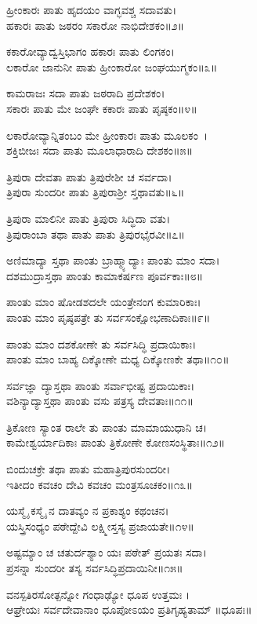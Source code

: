 ಹ್ರೀಂಕಾರಃ ಪಾತು ಹೃದಯಂ ವಾಗ್ಭವಶ್ಚ ಸದಾವತು।\\
ಹಕಾರಃ ಪಾತು ಜಠರಂ ಸಕಾರೋ ನಾಭಿದೇಶಕಂ॥೨॥

ಕಕಾರೋವ್ಯಾದ್ವಸ್ತಿಭಾಗಂ ಹಕಾರಃ ಪಾತು ಲಿಂಗಕಂ।\\
ಲಕಾರೋ ಜಾನುನೀ ಪಾತು ಹ್ರೀಂಕಾರೋ ಜಂಘಯುಗ್ಮಕಂ॥೩॥

ಕಾಮರಾಜಃ ಸದಾ ಪಾತು ಜಠರಾದಿ ಪ್ರದೇಶಕಂ।\\
ಸಕಾರಃ ಪಾತು ಮೇ ಜಂಘೇ ಕಕಾರಃ ಪಾತು ಪೃಷ್ಠಕಂ॥೪॥

ಲಕಾರೋವ್ಯಾನ್ನಿತಂಬಂ ಮೇ ಹ್ರೀಂಕಾರಃ ಪಾತು ಮೂಲಕಂ~।\\
ಶಕ್ತಿಬೀಜಃ ಸದಾ ಪಾತು ಮೂಲಾಧಾರಾದಿ ದೇಶಕಂ॥೫॥

ತ್ರಿಪುರಾ ದೇವತಾ ಪಾತು ತ್ರಿಪುರೇಶೀ ಚ ಸರ್ವದಾ।\\
ತ್ರಿಪುರಾ ಸುಂದರೀ ಪಾತು ತ್ರಿಪುರಾಶ್ರೀ ಸ್ತಥಾವತು॥೬॥

ತ್ರಿಪುರಾ ಮಾಲಿನೀ ಪಾತು ತ್ರಿಪುರಾ ಸಿದ್ಧಿದಾ ವತು।\\
ತ್ರಿಪುರಾಂಬಾ ತಥಾ ಪಾತು ಪಾತು ತ್ರಿಪುರಭೈರವೀ॥೭॥

ಅಣಿಮಾದ್ಯಾ ಸ್ತಥಾ ಪಾಂತು ಬ್ರಾಹ್ಮ್ಯಾದ್ಯಾಃ ಪಾಂತು ಮಾಂ ಸದಾ।\\
ದಶಮುದ್ರಾಸ್ತಥಾ ಪಾಂತು ಕಾಮಾಕರ್ಷಣ ಪೂರ್ವಕಾಃ॥೮॥

ಪಾಂತು ಮಾಂ ಷೋಡಶದಲೇ ಯಂತ್ರೇನಂಗ ಕುಮಾರಿಕಾಃ।\\
ಪಾಂತು ಮಾಂ ಪೃಷ್ಠಪತ್ರೇ ತು ಸರ್ವಸಂಕ್ಷೋಭಣಾದಿಕಾಃ॥೯॥

ಪಾಂತು ಮಾಂ ದಶಕೋಣೇ ತು ಸರ್ವಸಿದ್ಧಿ ಪ್ರದಾಯಿಕಾಃ।\\
ಪಾಂತು ಮಾಂ ಬಾಹ್ಯ ದಿಕ್ಕೋಣೇ ಮಧ್ಯ ದಿಕ್ಕೋಣಕೇ ತಥಾ॥೧೦॥

ಸರ್ವಜ್ಞಾ ದ್ಯಾಸ್ತಥಾ ಪಾಂತು ಸರ್ವಾಭೀಷ್ಟ ಪ್ರದಾಯಿಕಾಃ।\\
ವಶಿನ್ಯಾದ್ಯಾಸ್ತಥಾ ಪಾಂತು ವಸು ಪತ್ರಸ್ಯ ದೇವತಾಃ॥೧೧॥

ತ್ರಿಕೋಣ ಸ್ಯಾಂತ ರಾಲೇ ತು ಪಾಂತು ಮಾಮಾಯುಧಾನಿ ಚ।\\
ಕಾಮೇಶ್ವರ್ಯಾದಿಕಾಃ ಪಾಂತು ತ್ರಿಕೋಣೇ ಕೋಣಸಂಸ್ಥಿತಾಃ॥೧೨॥

ಬಿಂದುಚಕ್ರೇ ತಥಾ ಪಾತು ಮಹಾತ್ರಿಪುರಸುಂದರೀ।\\
ಇತೀದಂ ಕವಚಂ ದೇವಿ ಕವಚಂ ಮಂತ್ರಸೂಚಕಂ॥೧೩॥

ಯಸ್ಮೈ ಕಸ್ಮೈ ನ ದಾತವ್ಯಂ ನ ಪ್ರಕಾಶ್ಯಂ ಕಥಂಚನ।\\
ಯಸ್ತ್ರಿಸಂಧ್ಯಂ ಪಠೇದ್ದೇವಿ ಲಕ್ಷ್ಮೀಸ್ತಸ್ಯ ಪ್ರಜಾಯತೇ॥೧೪॥

ಅಷ್ಟಮ್ಯಾಂ ಚ ಚತುರ್ದಶ್ಯಾಂ ಯಃ ಪಠೇತ್ ಪ್ರಯತಃ ಸದಾ।\\
ಪ್ರಸನ್ನಾ ಸುಂದರೀ ತಸ್ಯ ಸರ್ವಸಿದ್ಧಿಪ್ರದಾಯಿನೀ॥೧೫॥

ವನಸ್ಪತಿರಸೋತ್ಪನ್ನೋ ಗಂಧಾಢ್ಯೋ ಧೂಪ ಉತ್ತಮಃ ।\\
ಆಘ್ರೇಯಃ ಸರ್ವದೇವಾನಾಂ ಧೂಪೋಽಯಂ ಪ್ರತಿಗೃಹ್ಯತಾಮ್ ॥ಧೂಪಃ॥

